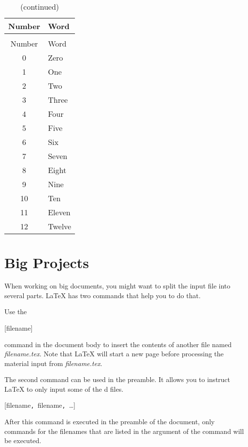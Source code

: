 \begin{example}[standalone, to_page=2, paperwidth=4.1cm] 
\usepackage{longtable}
\usepackage{booktabs}


\begin{longtable}{@{}cl@{}}
  \caption{Numbers} \\
  \toprule
  Number & Word         \\
  \midrule \endfirsthead

  \caption[]{(continued)} \\
  \toprule
  Number & Word      \\
  \midrule \endhead

  \bottomrule \endfoot
  \bottomrule \endlastfoot

  0      & Zero   \\
  1      & One    \\
  2      & Two     \\
  3      & Three \\
  4      & Four  \\
  5      & Five  \\
  6      & Six   \\
  7      & Seven \\
  8      & Eight \\
  9      & Nine  \\
  10     & Ten    \\
  11     & Eleven \\
  12     & Twelve \\
\end{longtable}
\end{example}

\section{Big Projects}
When working on big documents, you might want to split the input file
into several parts. \LaTeX{} has two commands that help you to do
that.

Use the
\begin{lscommand}
  [filename]
\end{lscommand}
command in the document body to insert the contents of another file named
\emph{filename.tex}. Note that \LaTeX{} will start a new page before processing
the material input from \emph{filename.tex}.

The second command can be used in the preamble. It allows you to
instruct \LaTeX{} to only input some of the \verb||d files.
\begin{lscommand}
  [filename\texttt{, }filename\texttt{, }\ldots]
\end{lscommand}
After this command is executed in the preamble of the document, only
 commands for the filenames that are listed in the
argument of the  command will be executed.

